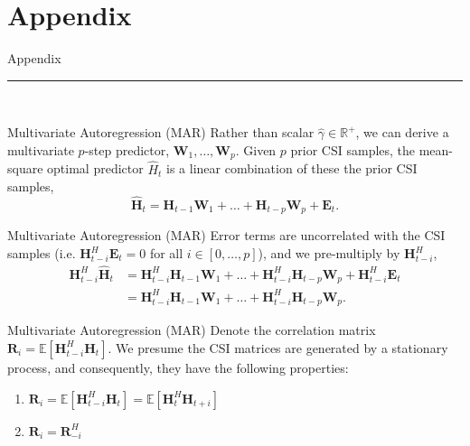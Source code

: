 \documentclass{beamer}
\begin{document}
\section*{Appendix}

  \begin{frame}[plain]
    \vfill
    \centering
    \begin{beamercolorbox}[sep=8pt,center,shadow=true,rounded=true]{Appendix}
      \insertsectionhead\par%
      \color{davisblue}\noindent\rule{10cm}{1pt} \\
    \end{beamercolorbox}
    \vfill
  \end{frame} 

  \begin{frame}{Multivariate Autoregression (MAR)}
    Rather than scalar $\hat\gamma \in \mathbb R^+$, we can derive a multivariate $p$-step predictor, $\mathbf W_1, \dots, \mathbf W_p$.
    Given $p$ prior CSI samples, the mean-square optimal predictor
    $\hat H_t$ is a linear combination of these the prior CSI samples,
    \begin{equation}
    \mathbf{\hat H}_{t} = \mathbf{H}_{t-1} \mathbf W_{1} + \dots + \mathbf{H}_{t-p} \mathbf W_{p} + \mathbf E_t.
    \end{equation}
  \end{frame}

  \begin{frame}{Multivariate Autoregression (MAR)}
    Error terms are uncorrelated with the CSI samples
    (i.e. $\mathbf H_{t-i}^H \mathbf E_t = 0$ for all $i \in [0, \dots, p]$),
    and we pre-multiply by $\mathbf H_{t-i}^H$,
    \begin{align}
    \mathbf{H}_{t-i}^H\mathbf{\hat H}_{t} &= \mathbf{H}_{t-i}^H\mathbf{H}_{t-1} \mathbf W_{1} + \dots + \mathbf{H}_{t-i}^H\mathbf{H}_{t-p} \mathbf W_{p} + \mathbf{H}_{t-i}^H\mathbf E_t \nonumber \\
                        &= \mathbf{H}_{t-i}^H\mathbf{H}_{t-1} \mathbf W_{1} + \dots + \mathbf{H}_{t-i}^H\mathbf{H}_{t-p} \mathbf W_{p}. \label{eq:var-init}
    \end{align}
  \end{frame}

  \begin{frame}{Multivariate Autoregression (MAR)}
    Denote the correlation matrix 
    $\mathbf R_i = \mathbb E [\mathbf H^H_{t-i}\mathbf H_{t}]$.
    We presume the CSI matrices are generated by a 
    stationary process, and consequently, 
    they have the following properties:
    \begin{enumerate}
      \item $\mathbf R_i = \mathbb E [\mathbf H^H_{t-i}\mathbf H_{t}] = \mathbb E [\mathbf H^H_{t}\mathbf H_{t+i}]$
      \item $\mathbf R_i = \mathbf R^H_{-i}$
    \end{enumerate}
  \end{frame}
\end{document}

